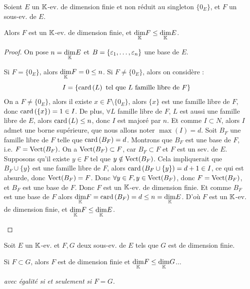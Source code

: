 \documentclass[12pt, a4paper]{report}
\begin{document}
\begin{property}
    Soient $E$ un $\mathbb{K}$-ev. de dimension finie et non réduit au singleton $\{0_E\}$, et $F$ un sous-ev. de $E$.

    Alors $F$ est un $\mathbb{K}$-ev. de dimension finie, et $\underset{\mathbb{K}}\dim F \le \underset{\mathbb{K}}\dim E$.
\end{property}

\begin{proof}
    On pose $n = \underset{\mathbb{K}}\dim E$ et $B = \{\varepsilon_1,\dots,\varepsilon_n\}$ une base de $E$.

    \begin{outline}
        \1 Si $F = \{0_E\}$, alors $\underset{\mathbb{K}}\dim F = 0 \le n$.
        \1 Si $F \ne \{0_E\}$, alors on considère :
        $$I = \{\mathrm{card}\left(L\right) \text{ tel que } L \text{ famille libre de } F\}$$
        \2 On a $F \ne \{0_E\}$, alors il existe $x \in F\setminus\{0_E\}$, alors $\{x\}$ est une famille libre de $F$, donc $\mathrm{card}\left(\{x\}\right) = 1 \in I$.
        \2 De plus, $\forall L$ famille libre de $F$, $L$ est aussi une famille libre de $E$, alors $\mathrm{card}\left(L\right) \le n$, donc $I$ est majoré par $n$.
        \2 Et comme $I \subset N$, alors $I$ admet une borne supérieure, que nous allons noter $\max(I) = d$.
        \2 Soit $B_F$ une famille libre de $F$ telle que $\mathrm{card}\left(B_F\right) = d$. Montrons que $B_F$ est une base de $F$, i.e. $F = \mathrm{Vect}(B_F)$.
            \3 On a $\mathrm{Vect}(B_F) \subset F$, car $B_F \subset F$ et $F$ est un sev. de $E$.
            \3 Supposons qu'il existe $y \in F$ tel que $y \notin \mathrm{Vect}(B_F)$.
            \3 Cela impliquerait que $B_F \cup \{y\}$ est une famille libre de $F$, alors $\mathrm{card}\left(B_F \cup \{y\}\right) = d+1 \in I$, ce qui est absurde, donc $\mathrm{Vect}(B_F) = F$.
            \3 Donc $\forall y \in F, y \in \mathrm{Vect}(B_F)$, donc $F = \mathrm{Vect}(B_F)$, et $B_F$ est une base de $F$.
            \2 Donc $F$ est un $\mathbb{K}$-ev. de dimension finie.
            \2 Et comme $B_F$ est une base de $F$ alors $\underset{\mathbb{K}}\dim F = \mathrm{card}\left(B_F\right) = d \le n = \underset{\mathbb{K}}\dim E$.
            \2 D'où $F$ est un $\mathbb{K}$-ev. de dimension finie, et $\underset{\mathbb{K}}\dim F \le \underset{\mathbb{K}}\dim E$.
    \end{outline}
\end{proof}

\begin{property}
    Soit $E$ un $\mathbb{K}$-ev. et $F,G$ deux sous-ev. de $E$ tels que $G$ est de dimension finie.

    Si $F \subset G$, alors $F$ est de dimension finie et $\underset{\mathbb{K}}\dim F \le \underset{\mathbb{K}}\dim G$...
    
    \textit{avec égalité si et seulement si $F = G$.}
\end{property}
\end{document}
